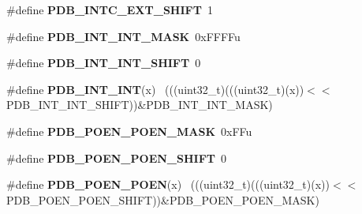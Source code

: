 \begin{DoxyCompactItemize}
\item 
\hypertarget{group___p_d_b___register___masks_ga94b6fffc0fb61e58e2436696dc674340}{}\#define {\bfseries P\+D\+B\+\_\+\+I\+N\+T\+C\+\_\+\+E\+X\+T\+\_\+\+S\+H\+I\+F\+T}~1\label{group___p_d_b___register___masks_ga94b6fffc0fb61e58e2436696dc674340}

\item 
\hypertarget{group___p_d_b___register___masks_ga04262fdbd8c3565c23a025cb119f1549}{}\#define {\bfseries P\+D\+B\+\_\+\+I\+N\+T\+\_\+\+I\+N\+T\+\_\+\+M\+A\+S\+K}~0x\+F\+F\+F\+Fu\label{group___p_d_b___register___masks_ga04262fdbd8c3565c23a025cb119f1549}

\item 
\hypertarget{group___p_d_b___register___masks_ga5b99cf0c9ae2fa2cf6e4200a7e3bf13b}{}\#define {\bfseries P\+D\+B\+\_\+\+I\+N\+T\+\_\+\+I\+N\+T\+\_\+\+S\+H\+I\+F\+T}~0\label{group___p_d_b___register___masks_ga5b99cf0c9ae2fa2cf6e4200a7e3bf13b}

\item 
\hypertarget{group___p_d_b___register___masks_ga9a3ae5bfc73156adbab6465646893347}{}\#define {\bfseries P\+D\+B\+\_\+\+I\+N\+T\+\_\+\+I\+N\+T}(x)                                                  ~(((uint32\+\_\+t)(((uint32\+\_\+t)(x))$<$$<$P\+D\+B\+\_\+\+I\+N\+T\+\_\+\+I\+N\+T\+\_\+\+S\+H\+I\+F\+T))\&P\+D\+B\+\_\+\+I\+N\+T\+\_\+\+I\+N\+T\+\_\+\+M\+A\+S\+K)\label{group___p_d_b___register___masks_ga9a3ae5bfc73156adbab6465646893347}

\item 
\hypertarget{group___p_d_b___register___masks_gadff2842454cba42f94cc2568cd20df3d}{}\#define {\bfseries P\+D\+B\+\_\+\+P\+O\+E\+N\+\_\+\+P\+O\+E\+N\+\_\+\+M\+A\+S\+K}~0x\+F\+Fu\label{group___p_d_b___register___masks_gadff2842454cba42f94cc2568cd20df3d}

\item 
\hypertarget{group___p_d_b___register___masks_ga00643f248ccf8b14021f9983f0e32ac8}{}\#define {\bfseries P\+D\+B\+\_\+\+P\+O\+E\+N\+\_\+\+P\+O\+E\+N\+\_\+\+S\+H\+I\+F\+T}~0\label{group___p_d_b___register___masks_ga00643f248ccf8b14021f9983f0e32ac8}

\item 
\hypertarget{group___p_d_b___register___masks_ga276eca07e19cae6eb9b9a740420733c7}{}\#define {\bfseries P\+D\+B\+\_\+\+P\+O\+E\+N\+\_\+\+P\+O\+E\+N}(x)                                              ~(((uint32\+\_\+t)(((uint32\+\_\+t)(x))$<$$<$P\+D\+B\+\_\+\+P\+O\+E\+N\+\_\+\+P\+O\+E\+N\+\_\+\+S\+H\+I\+F\+T))\&P\+D\+B\+\_\+\+P\+O\+E\+N\+\_\+\+P\+O\+E\+N\+\_\+\+M\+A\+S\+K)\label{group___p_d_b___register___masks_ga276eca07e19cae6eb9b9a740420733c7}


\end{DoxyCompactItemize}
